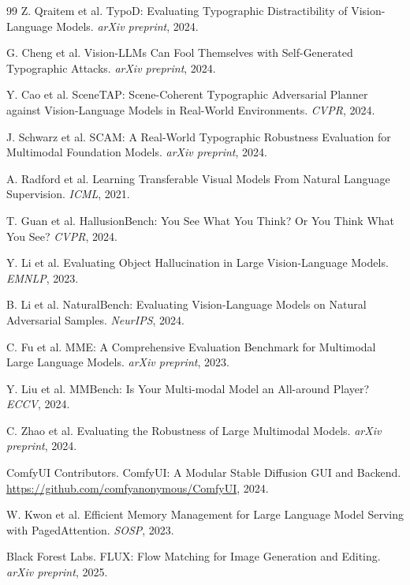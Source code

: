 \documentclass[12pt,a4paper]{article}
\begin{document}
\begin{thebibliography}{99}
Z. Qraitem et al. TypoD: Evaluating Typographic Distractibility of Vision-Language Models. \emph{arXiv preprint}, 2024.

G. Cheng et al. Vision-LLMs Can Fool Themselves with Self-Generated Typographic Attacks. \emph{arXiv preprint}, 2024.

Y. Cao et al. SceneTAP: Scene-Coherent Typographic Adversarial Planner against Vision-Language Models in Real-World Environments. \emph{CVPR}, 2024.

J. Schwarz et al. SCAM: A Real-World Typographic Robustness Evaluation for Multimodal Foundation Models. \emph{arXiv preprint}, 2024.

A. Radford et al. Learning Transferable Visual Models From Natural Language Supervision. \emph{ICML}, 2021.

T. Guan et al. HallusionBench: You See What You Think? Or You Think What You See? \emph{CVPR}, 2024.

Y. Li et al. Evaluating Object Hallucination in Large Vision-Language Models. \emph{EMNLP}, 2023.

B. Li et al. NaturalBench: Evaluating Vision-Language Models on Natural Adversarial Samples. \emph{NeurIPS}, 2024.

C. Fu et al. MME: A Comprehensive Evaluation Benchmark for Multimodal Large Language Models. \emph{arXiv preprint}, 2023.

Y. Liu et al. MMBench: Is Your Multi-modal Model an All-around Player? \emph{ECCV}, 2024.

C. Zhao et al. Evaluating the Robustness of Large Multimodal Models. \emph{arXiv preprint}, 2024.

ComfyUI Contributors. ComfyUI: A Modular Stable Diffusion GUI and Backend. \url{https://github.com/comfyanonymous/ComfyUI}, 2024.

W. Kwon et al. Efficient Memory Management for Large Language Model Serving with PagedAttention. \emph{SOSP}, 2023.

Black Forest Labs. FLUX: Flow Matching for Image Generation and Editing. \emph{arXiv preprint}, 2025.

\end{thebibliography}
\end{document}
